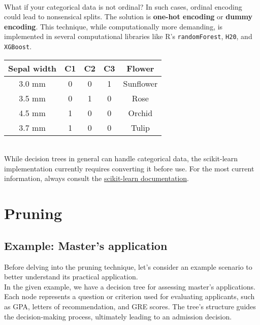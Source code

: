 \documentclass[11pt,a4paper]{report}
\begin{document}
\paragraph{}What if your categorical data is not ordinal? In such cases, ordinal encoding could lead to nonsensical splits. The solution is \textbf{one-hot encoding} or \textbf{dummy encoding}. This technique, while computationally more demanding, is implemented in several computational libraries like R's \texttt{randomForest}, \texttt{H20}, and \texttt{XGBoost}.\\
\begin{center}

\begin{tabular}{ |c|c|c|c|c| } 
\hline
Sepal width&{\color{Plum}C1}&{\color{red}C2}&{\color{yellow}C3}& Flower\\\hline\hline
3.0 mm & 0&0&1& Sunflower \\\hline
3.5 mm & 0&1&0& Rose \\\hline
4.5 mm & 1&0&0& Orchid\\\hline
3.7 mm & 1&0&0& Tulip\\\hline
\end{tabular}
\end{center}
\\
While decision trees in general can handle categorical data, the scikit-learn implementation currently requires converting it before use. For the most current information, always consult the \href{https://scikit-learn.org/stable/modules/tree.html#tree-algorithms}{scikit-learn documentation}.
\section{Pruning}
\subsection{Example: Master's application}
Before delving into the pruning technique, let's consider an example scenario to better understand its practical application.\\
In the given example, we have a decision tree for assessing master's applications. Each node represents a question or criterion used for evaluating applicants, such as GPA, letters of recommendation, and GRE scores. The tree's structure guides the decision-making process, ultimately leading to an admission decision.
\end{document}
